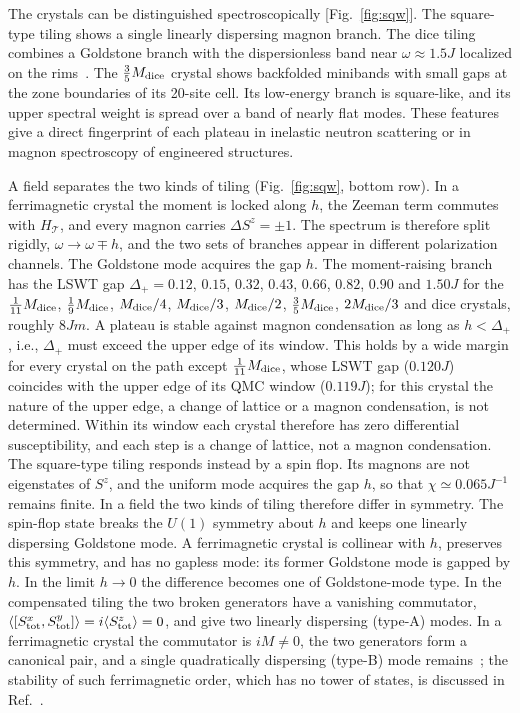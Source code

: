 \documentclass[prb,twocolumn,amsmath,amssymb,floatfix]{revtex4-2}
\newcommand{\Md}{M_{\rm dice}}
\begin{document}
The crystals can be distinguished spectroscopically [Fig.~\ref{fig:sqw}]. The square-type tiling shows a single linearly dispersing magnon branch. The dice tiling combines a Goldstone branch with the dispersionless band near $\omega\approx1.5J$ localized on the rims~\cite{Sutherland1986}. The $\frac35\Md$ crystal shows backfolded minibands with small gaps at the zone boundaries of its 20-site cell. Its low-energy branch is square-like, and its upper spectral weight is spread over a band of nearly flat modes. These features give a direct fingerprint of each plateau in inelastic neutron scattering or in magnon spectroscopy of engineered structures.

A field separates the two kinds of tiling (Fig.~\ref{fig:sqw}, bottom row). In a ferrimagnetic crystal the moment is locked along $h$, the Zeeman term commutes with $H_{\mathcal T}$, and every magnon carries $\Delta S^z=\pm1$. The spectrum is therefore split rigidly, $\omega\to\omega\mp h$, and the two sets of branches appear in different polarization channels. The Goldstone mode acquires the gap $h$. The moment-raising branch has the LSWT gap $\Delta_+=0.12$, $0.15$, $0.32$, $0.43$, $0.66$, $0.82$, $0.90$ and $1.50J$ for the $\frac1{11}\Md$, $\frac19\Md$, $\Md/4$, $\Md/3$, $\Md/2$, $\frac35\Md$, $2\Md/3$ and dice crystals, roughly $8Jm$. A plateau is stable against magnon condensation as long as $h<\Delta_+$, i.e., $\Delta_+$ must exceed the upper edge of its window. This holds by a wide margin for every crystal on the path except $\frac1{11}\Md$, whose LSWT gap ($0.120J$) coincides with the upper edge of its QMC window ($0.119J$); for this crystal the nature of the upper edge, a change of lattice or a magnon condensation, is not determined. Within its window each crystal therefore has zero differential susceptibility, and each step is a change of lattice, not a magnon condensation. The square-type tiling responds instead by a spin flop. Its magnons are not eigenstates of $S^z$, and the uniform mode acquires the gap $h$, so that $\chi\simeq0.065J^{-1}$ remains finite. In a field the two kinds of tiling therefore differ in symmetry. The spin-flop state breaks the $U(1)$ symmetry about $h$ and keeps one linearly dispersing Goldstone mode. A ferrimagnetic crystal is collinear with $h$, preserves this symmetry, and has no gapless mode: its former Goldstone mode is gapped by $h$. In the limit $h\to0$ the difference becomes one of Goldstone-mode type. In the compensated tiling the two broken generators have a vanishing commutator, $\langle[S^x_{\rm tot},S^y_{\rm tot}]\rangle=i\langle S^z_{\rm tot}\rangle=0$, and give two linearly dispersing (type-A) modes. In a ferrimagnetic crystal the commutator is $iM\neq0$, the two generators form a canonical pair, and a single quadratically dispersing (type-B) mode remains~\cite{NielsenChadha1976,WatanabeBrauner2011,Watanabe2012,Hidaka2013}; the stability of such ferrimagnetic order, which has no tower of states, is discussed in Ref.~\cite{Rademaker2020}.
\end{document}
